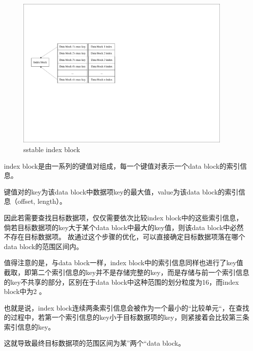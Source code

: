 \begin{enumerate}
\begin{enumerate}
\begin{enumerate}
\begin{figure}[H]
	\centering
	\includegraphics[width=0.95\textwidth]{pdf/indexblock.pdf}
	\caption{sstable index block}
	\label{sstable_index_block}
\end{figure}

index block是由一系列的键值对组成，每一个键值对表示一个data block的索引信息。

键值对的key为该data block中数据项key的最大值，value为该data block的索引信息（offset, length）。

因此若需要查找目标数据项，仅仅需要依次比较index block中的这些索引信息，
倘若目标数据项的key大于某个data block中最大的key值，则该data block中必然不存在目标数据项。
故通过这个步骤的优化，可以直接确定目标数据项落在哪个data block的范围区间内。

值得注意的是，与data block一样，index block中的索引信息同样也进行了key值截取，即第二个索引信息的key并不是存储完整的key，而是存储与前一个索引信息的key不共享的部分，区别在于data block中这种范围的划分粒度为16，而index block中为2 。

也就是说，index block连续两条索引信息会被作为一个最小的“比较单元“，在查找的过程中，若第一个索引信息的key小于目标数据项的key，则紧接着会比较第三条索引信息的key。

这就导致最终目标数据项的范围区间为某”两个“data block。


\end{enumerate}
\end{enumerate}
\end{enumerate}
